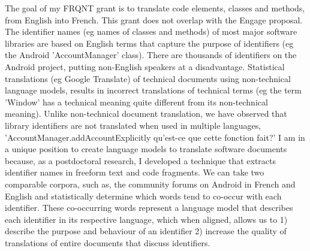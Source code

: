 \documentclass[12pt, letterpaper]{article}
\begin{document}
The goal of my FRQNT grant is to translate code elements, classes and methods,
from English into French. This grant does not overlap with the Engage proposal.
%
The identifier names (eg names of classes and methods) of most major software
libraries are based on English terms that capture the purpose of identifiers
(eg the Android 'AccountManager' class). There are thousands of identifiers on
the Android project, putting non-English speakers at a disadvantage.
Statistical translations (eg Google Translate) of technical
documents using non-technical language models, results in incorrect
translations of technical terms (eg the term 'Window' has a technical meaning
quite different from its non-technical meaning). Unlike non-technical document
translation, we have observed that library identifiers are not translated when
used in multiple languages, 'AccountManager.addAccountExplicitly qu'est-ce que
cette fonction fait?' I am in a unique position to create language models to
translate software documents because, as a postdoctoral research, I developed a
technique that extracts identifier names in freeform text and code fragments.
We can take two comparable corpora, such as, the community forums on Android in
French and English and statistically determine which words tend to co-occur
with each identifier. These co-occurring words represent a language model that
describes each identifier in its respective language, which when aligned,
allows us to 1) describe the purpose and behaviour of an identifier 2) increase
the quality of translations of entire documents that discuss identifiers.
\end{document}
